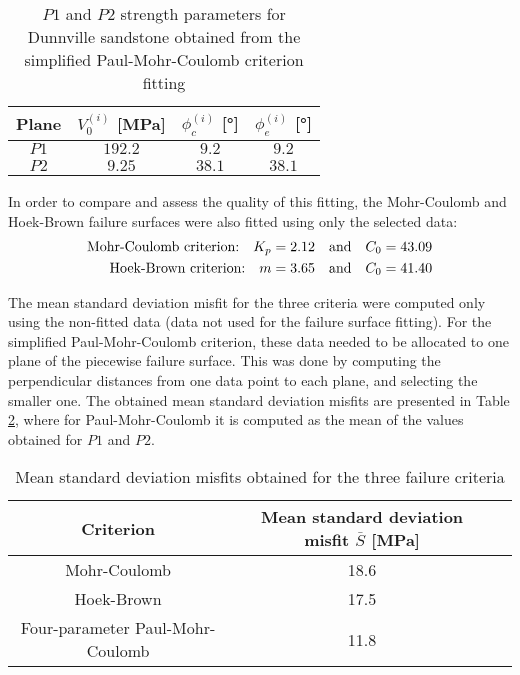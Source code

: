 \begin{table}[h!]
    \centering 
    \captionsetup{justification=centering}
    \caption{$P1$ and $P2$ strength parameters for Dunnville sandstone obtained from the simplified Paul-Mohr-Coulomb criterion fitting}
    \begin{tabular}{cccc}
        \hline 
        Plane & $V_0^{(i)}$ [\si{MPa}] & $\phi_c^{(i)}$ [\si{\degree}] & $\phi_e^{(i)}$ [\si{\degree}]\\
        \hline
        \hline
        $P1$ & $192.2$ & $9.2$ & $9.2$\\
        $P2$ & $9.25$ & $38.1$ & $38.1$\\
        \hline
    \end{tabular}
    \label{tb5:4pPMC_sol}
\end{table}

In order to compare and assess the quality of this fitting, the Mohr-Coulomb and Hoek-Brown failure surfaces were also fitted using only the selected data: 
\begin{align}\label{eq5:4pMC_HB_sol}
    \textmd{Mohr-Coulomb criterion:} \quad K_p = 2.12 \quad \textmd{and} \quad C_0 = 43.09\\
    \textmd{Hoek-Brown criterion:} \quad m = 3.65 \quad \textmd{and} \quad C_0 = 41.40
\end{align}

The mean standard deviation misfit for the three criteria were computed only using the non-fitted data (data not used for the failure surface fitting). For the simplified Paul-Mohr-Coulomb criterion, these data needed to be allocated to one plane of the piecewise failure surface. This was done by computing the perpendicular distances from one data point to each plane, and selecting the smaller one. The obtained mean standard deviation misfits are presented in Table \ref{tb5:stand_dev_4p}, where for Paul-Mohr-Coulomb it is computed as the mean of the values obtained for $P1$ and $P2$. 

\begin{table}[h!]
    \centering
    \captionsetup{justification=centering}
    \caption{Mean standard deviation misfits obtained for the three failure criteria}
    \begin{tabular}{ccc}
        \hline 
        Criterion & Mean standard deviation misfit $\bar{S}$ [\si{MPa}] \\
        \hline
        \hline
        Mohr-Coulomb & 18.6 \\
        Hoek-Brown & 17.5\\
        Four-parameter Paul-Mohr-Coulomb & 11.8 \\
        \hline
    \end{tabular}
    \label{tb5:stand_dev_4p}
\end{table}

